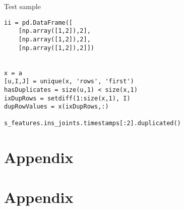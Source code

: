 Test sample
\begin{verbatim}
ii = pd.DataFrame([
    [np.array([1,2]),2], 
    [np.array([1,2]),2], 
    [np.array([1,2]),2]])
    
    
x = a
[u,I,J] = unique(x, 'rows', 'first')
hasDuplicates = size(u,1) < size(x,1)
ixDupRows = setdiff(1:size(x,1), I)
dupRowValues = x(ixDupRows,:)

s_features.ins_joints.timestamps[:2].duplicated()
\end{verbatim}

\chapter{Appendix}

\newpage
\cleardoublepage
\appendix
\chapter{Appendix}
\label{code}
\inputminted[linenos, fontsize = \scriptsize]{haskell}{../src/utils/defect_utils.py}


